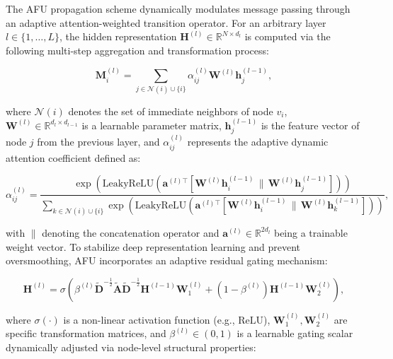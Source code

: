 \documentclass[10pt,twocolumn]{article}
\begin{document}
The \textsc{AFU} propagation scheme dynamically modulates message passing through an adaptive attention-weighted transition operator. For an arbitrary layer $l \in \{1, \dots, L\}$, the hidden representation $\mathbf{H}^{(l)} \in \mathbb{R}^{N \times d_l}$ is computed via the following multi-step aggregation and transformation process:

\begin{equation}
\mathbf{M}_{i}^{(l)} = \sum_{j \in \mathcal{N}(i) \cup \{i\}} \alpha_{ij}^{(l)} \mathbf{W}^{(l)} \mathbf{h}_{j}^{(l-1)},
\end{equation}

where $\mathcal{N}(i)$ denotes the set of immediate neighbors of node $v_i$, $\mathbf{W}^{(l)} \in \mathbb{R}^{d_l \times d_{l-1}}$ is a learnable parameter matrix, $\mathbf{h}_{j}^{(l-1)}$ is the feature vector of node $j$ from the previous layer, and $\alpha_{ij}^{(l)}$ represents the adaptive dynamic attention coefficient defined as:

\begin{equation}
\alpha_{ij}^{(l)} = \frac{\exp\left(\text{LeakyReLU}\left(\mathbf{a}^{(l)\top} \left[ \mathbf{W}^{(l)} \mathbf{h}_{i}^{(l-1)} \,\|\, \mathbf{W}^{(l)} \mathbf{h}_{j}^{(l-1)} \right]\right)\right)}{\sum_{k \in \mathcal{N}(i) \cup \{i\}} \exp\left(\text{LeakyReLU}\left(\mathbf{a}^{(l)\top} \left[ \mathbf{W}^{(l)} \mathbf{h}_{i}^{(l-1)} \,\|\, \mathbf{W}^{(l)} \mathbf{h}_{k}^{(l-1)} \right]\right)\right)},
\end{equation}

with $\|$ denoting the concatenation operator and $\mathbf{a}^{(l)} \in \mathbb{R}^{2d_l}$ being a trainable weight vector. To stabilize deep representation learning and prevent oversmoothing, \textsc{AFU} incorporates an adaptive residual gating mechanism:

\begin{equation}
\mathbf{H}^{(l)} = \sigma \left( \beta^{(l)} \tilde{\mathbf{D}}^{-\frac{1}{2}} \tilde{\mathbf{A}} \tilde{\mathbf{D}}^{-\frac{1}{2}} \mathbf{H}^{(l-1)} \mathbf{W}_{1}^{(l)} + (1 - \beta^{(l)}) \mathbf{H}^{(l-1)} \mathbf{W}_{2}^{(l)} \right),
\end{equation}

where $\sigma(\cdot)$ is a non-linear activation function (e.g., $\text{ReLU}$), $\mathbf{W}_{1}^{(l)}, \mathbf{W}_{2}^{(l)}$ are specific transformation matrices, and $\beta^{(l)} \in (0, 1)$ is a learnable gating scalar dynamically adjusted via node-level structural properties:
\end{document}
